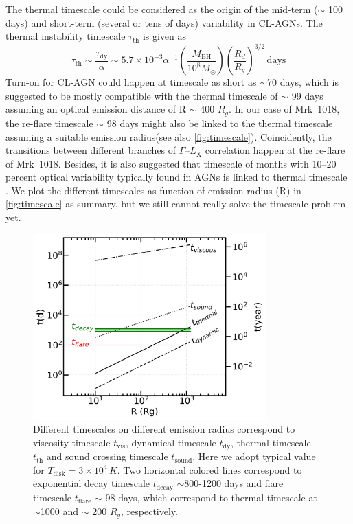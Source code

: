 \documentclass[twocolumn]{aastex63}
\begin{document}
The thermal timescale could be considered as the origin of the mid-term ($\sim$ 100 days) and short-term (several or tens of days) variability in CL-AGNs. The thermal instability timescale $\tau_\mathrm{th}$ is given as
\begin{equation}
\tau_\mathrm{th} \sim \frac{\tau_\mathrm{dy}}{\alpha} \sim 5.7\times 10^{-3} \alpha^{-1}(\frac{M_\mathrm{BH}}{10^8M_{\odot}})(\frac{R_d}{R_g})^{3/2} \, \mathrm{days}
\end{equation}
Turn-on for CL-AGN could happen at timescale as short as $\sim$70 days\citep[see][]{2019MNRAS.487.4057K},  which is suggested to be mostly compatible with the thermal timescale of $\sim$ 99 days assuming an optical emission distance of R $\sim$ 400 $R_g$. In our case of Mrk~1018, the re-flare timescale $\sim$ 98 days might also be linked to the thermal timescale assuming a suitable emission radius(see also \autoref{fig:timescale}). Coincidently, the transitions between different branches of $\Gamma$--$L_\mathrm{X}$ correlation happen at the re-flare of Mrk~1018. Besides, it is also suggested that timescale of months with 10--20 percent optical variability typically found in AGNs is linked to thermal timescale \citep[see also discussion in ][]{2018MNRAS.480.3898N}. We plot the different timescales as function of emission radius (R) in \autoref{fig:timescale} as summary, but we still cannot really solve the timescale problem yet. 
\begin{figure}
\centering
	\includegraphics[width=0.8\textwidth]{./pic/Mrk1018_timescale.png}
    \caption{Different timescales on different emission radius correspond to viscosity timescale $t_\mathrm{vis}$, dynamical timescale $t_\mathrm{dy}$, thermal timescale $t_\mathrm{th}$ and sound crossing timescale $t_\mathrm{sound}$. Here we adopt typical value for $T_\mathrm{disk}=3\times10^4\, K$. Two horizontal colored lines correspond to exponential decay timescale $t_\mathrm{decay}$ $\sim$800-1200 days and flare timescale $t_\mathrm{flare}$ $\sim$ 98 days, which correspond to thermal timescale at $\sim$1000 and $\sim$ 200 $R_g$, respectively.}
    \label{fig:timescale}
\end{figure}
\end{document}
